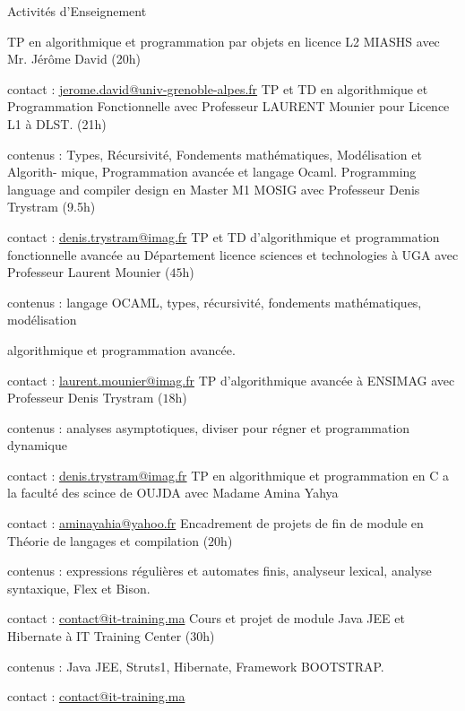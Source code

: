 

\begin{rubric}{Activités d’Enseignement}

    \entry*[$2017$ -- $2018$] TP en algorithmique et programmation par objets en licence L2 MIASHS avec Mr. Jérôme David (20h)
    \par contact :  \href{mailto:jerome.david@univ-grenoble-alpes.fr}{jerome.david@univ-grenoble-alpes.fr}
    \entry*[$2017$ -- $2018$] TP et TD en algorithmique et Programmation Fonctionnelle avec Professeur LAURENT Mounier pour Licence L1 à DLST. (21h)
    \par contenus : Types, Récursivité, Fondements mathématiques, Modélisation et Algorith-
mique, Programmation avancée et langage Ocaml.
    \entry*[$2017$ -- $2018$] Programming language and compiler design en Master M1 MOSIG avec Professeur Denis Trystram (9.5h)
	\par contact :  \href{mailto:denis.trystram@imag.fr}{denis.trystram@imag.fr}
\entry*[$2016$ -- $2017$]%
	TP et TD d'algorithmique et programmation fonctionnelle avancée au Département licence sciences et technologies à UGA avec Professeur Laurent Mounier ($45$h)
	\par contenus : langage OCAML, types, récursivité, fondements mathématiques, modélisation   
    \par algorithmique et programmation avancée.
	\par contact :  \href{mailto:laurent.mounier@imag.fr}{laurent.mounier@imag.fr}
%
\entry*[$2016$ -- $2017$]%
	TP d'algorithmique avancée à ENSIMAG avec Professeur Denis Trystram ($18$h)
	\par contenus : analyses asymptotiques, diviser pour régner et programmation dynamique
	\par contact :  \href{mailto:denis.trystram@imag.fr}{denis.trystram@imag.fr}
%
\entry*[$2014$ -- $2015$] TP en algorithmique et programmation en C a la faculté des scince de OUJDA avec Madame Amina Yahya
     \par contact :  \href{mailto:aminayahia@yahoo.fr}{aminayahia@yahoo.fr}
\entry*[$2014$ -- $2015$]
        Encadrement de projets de fin de module en Théorie de langages et compilation ($20$h)
	\par contenus : expressions régulières et automates finis, analyseur lexical, analyse syntaxique, Flex et Bison.
	\par contact :  \href{mailto:contact@it-training.ma}{contact@it-training.ma}
%
\entry*[$2014$ -- $2015$]%
        Cours et projet de module Java JEE et Hibernate à IT Training Center ($30$h)
	\par contenus : Java JEE, Struts1, Hibernate, Framework BOOTSTRAP.
	\par contact :  \href{mailto:contact@it-training.ma}{contact@it-training.ma}
%
\end{rubric}
